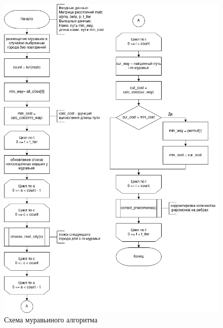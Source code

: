 \begin{figure}[H]
	\begin{center}
		\includegraphics[scale=0.6]{assets/antMain.png}
	\end{center}
	\caption{Схема муравьиного алгоритма}
\end{figure}

